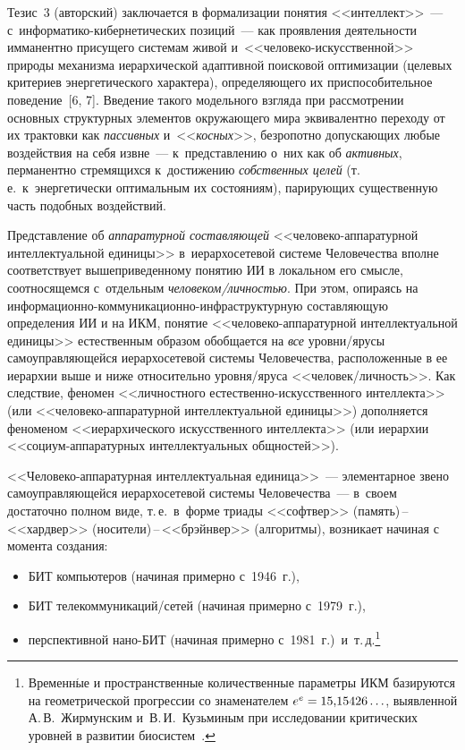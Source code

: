 \begin{multicols}{2}
  Тезис~3 (авторский) заключается в формализации понятия <<интеллект>>~--- 
с~ин\-фор\-ма\-ти\-ко-ки\-бер\-не\-ти\-че\-ских позиций~--- как проявления 
деятельности имманентно присущего системам живой\linebreak  
и~<<че\-ло\-ве\-ко-ис\-кус\-ствен\-ной>> природы механизма иерархической 
адаптивной поисковой оптимизации (целевых критериев энергетического 
характера), определяющего их приспособительное поведение~[6, 7]. Введение 
такого модельного взгляда при рассмотрении основных структурных элементов 
окружающего мира эквивалентно переходу от их трактовки как 
\textit{пассивных} и~<<\textit{косных}>>, безропотно допускающих любые 
воздействия на себя извне~--- к~представлению о~них как об \textit{активных}, 
перманентно стремящихся к~достижению \textit{собственных целей} (т.\,е.\ 
к~энергетически оптимальным их состояниям), парирующих существенную 
часть подобных воздействий. 
  
  Представление об \textit{аппаратурной составляющей} 
 <<че\-ло\-ве\-ко-ап\-па\-ра\-тур\-ной интеллектуальной единицы>>  
в~ие\-рар\-хо\-се\-те\-вой сис\-те\-ме Человечества вполне соответствует 
вышеприведенному понятию ИИ в локальном его смысле, соотносящемся 
с~отдельным \textit{че\-ло\-ве\-ком/лич\-ностью}. При этом, опираясь на 
ин\-фор\-ма\-ци\-он\-но-ком\-му\-ни\-ка\-ци\-он\-но-ин\-фра\-струк\-тур\-ную со\-став\-ля\-ющую 
определения ИИ и на ИКМ, понятие <<че\-ло\-ве\-ко-ап\-па\-ра\-тур\-ной 
интеллектуальной единицы>> естественным образом обобщается на \textit{все}  
уров\-ни/яру\-сы са\-мо\-управ\-ля\-ющей\-ся ие\-рар\-хо\-се\-те\-вой сис\-те\-мы 
Человечества, расположенные в ее иерархии выше и ниже относительно  
уров\-ня/яру\-са <<че\-ло\-век/лич\-ность>>. Как следствие, феномен 
<<личностного ес\-тест\-вен\-но-ис\-кус\-ст\-вен\-но\-го интеллекта>> (или  
<<че\-ло\-ве\-ко-ап\-па\-ра\-тур\-ной интеллектуальной единицы>>) 
дополняется феноменом <<иерархического искусственного интеллекта>> (или 
иерархии <<со\-ци\-ум-ап\-па\-ра\-тур\-ных интеллектуальных общностей>>). 
  
  <<Человеко-аппаратурная интеллектуальная единица>>~--- элементарное 
звено са\-мо\-управ\-ля\-ющей\-ся ие\-рар\-хо\-се\-те\-вой сис\-те\-мы Человечества~--- 
в~своем достаточно полном виде, т.\,е.\ в~форме триады  
<<софтвер>> (па\-мять)\,--\,<<хард\-вер>> (но\-си\-те\-ли)\,--\,<<брэйн\-вер>> 
(алгоритмы), возникает начиная с момента создания: 
  \begin{itemize}
\item БИТ компьютеров (начиная примерно с~1946~г.),
\item БИТ телекоммуникаций/сетей (начиная примерно с~1979~г.),
\item перспективной нано-БИТ (начиная примерно с~1981~г.)\ 
и~т.\,д.\footnote{Временн$\acute{\mbox{ы}}$е и пространственные количественные 
параметры ИКМ базируются на геометрической прогрессии со знаменателем 
$e^e\hm=15{,}15426\ldots$, выявленной А.\,В.~Жирмунским и~В.\,И.~Кузьминым при 
исследовании критических уровней в развитии биосистем~\cite{8-gr}.}
\end{itemize}


\end{multicols}
